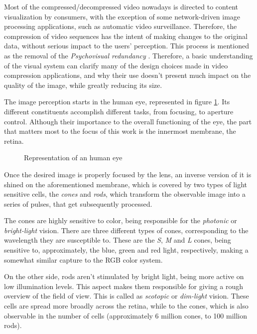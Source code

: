 \nocite{gonzalezDigitalImageProcessing2018}

Most of the compressed/decompressed video nowadays is directed to content visualization by consumers, with the exception of some network-driven image processing applications, such as automatic video surveillance. Therefore, the compression of video sequences has the intent of making changes to the original data, without serious impact to the users' perception. This process is mentioned as the removal of the \emph{Psychovisual redundancy} \cite{shiImageVideoCompression2008}. Therefore, a basic understanding of the visual system can clarify many of the design choices made in video compression applications, and why their use doesn't present much impact on the quality of the image, while greatly reducing its size.

The image perception starts in the human eye, represented in figure \ref{fig:eye}. Its different constituents accomplish different tasks, from focusing, to aperture control. Although their importance to the overall functioning of the eye, the part that matters most to the focus of this work is the innermost membrane, the retina.

\begin{figure}[h]
    \centering
    \caption{Representation of an human eye}
    \label{fig:eye}
\end{figure}

Once the desired image is properly focused by the lens, an inverse version of it is shined on the aforementioned membrane, which is covered by two types of light sensitive cells, the \emph{cones} and \emph{rods}, which transform the observable image into a series of pulses, that get subsequently processed.

The cones are highly sensitive to color, being responsible for the \emph{photonic} or \emph{bright-light} vision. There are three different types of cones, corresponding to the wavelength they are susceptible to. These are the \emph{S}, \emph{M} and \emph{L} cones, being sensitive to, approximately, the blue, green and red light, respectively, making a somewhat similar capture to the RGB color system.

On the other side, rods aren't stimulated by bright light, being more active on low illumination levels. This aspect makes them responsible for giving a rough overview of the field of view. This is called as \emph{scotopic} or \emph{dim-light} vision. These cells are spread more broadly across the retina, while to the cones, which is also observable in the number of cells (approximately 6 million cones, to 100 million rods).

